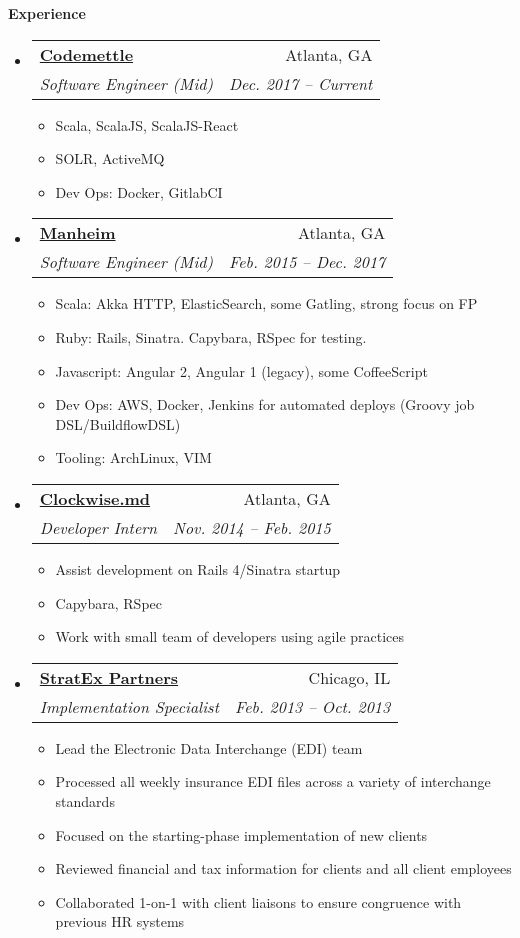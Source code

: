 \documentclass[letterpaper,11pt]{article}
\makeatletter
\newcommand{\resitem}[1]{\item #1 \vspace{-2pt}}
\newcommand{\resheading}[1]{{\large \colorbox{mygrey}{\begin{minipage}{\textwidth}{\textbf{#1 \vphantom{p\^{E}}}}\end{minipage}}}}
\newcommand{\ressubheading}[4]{
\begin{tabular*}{6.5in}{l@{\extracolsep{\fill}}r}
		\textbf{#1} & #2 \\
		\textit{#3} & \textit{#4} \\
\end{tabular*}\vspace{-6pt}}
\makeatother
\begin{document}
\resheading{Experience}
\begin{itemize}
\item
  \ressubheading{\href{http://www.codemettle.com/}{Codemettle}}{Atlanta, GA}{Software Engineer (Mid)}{Dec. 2017 -- Current}
    { \footnotesize
    \begin{itemize}
        \resitem{Scala, ScalaJS, ScalaJS-React}
        \resitem{SOLR, ActiveMQ}
        \resitem{Dev Ops: Docker, GitlabCI}
    \end{itemize}
    }
\item
  \ressubheading{\href{http://www.manheim.com/}{Manheim}}{Atlanta, GA}{Software Engineer (Mid)}{Feb. 2015 -- Dec. 2017}
    { \footnotesize
    \begin{itemize}
        \resitem{Scala: Akka HTTP, ElasticSearch, some Gatling, strong focus on FP}
        \resitem{Ruby: Rails, Sinatra. Capybara, RSpec for testing.}
        \resitem{Javascript: Angular 2, Angular 1 (legacy), some CoffeeScript}
        \resitem{Dev Ops: AWS, Docker, Jenkins for automated deploys (Groovy job DSL/BuildflowDSL)}
        \resitem{Tooling: ArchLinux, VIM}
    \end{itemize}
    }
\item
\ressubheading{\href{http://www.clockwise.md/}{Clockwise.md}}{Atlanta, GA}{Developer Intern}{Nov. 2014 -- Feb. 2015}
    { \footnotesize
    \begin{itemize}
        \resitem{Assist development on Rails 4/Sinatra startup}
        \resitem{Capybara, RSpec}
        \resitem{Work with small team of developers using agile practices}
    \end{itemize}
    }
\item
  \ressubheading{\href{http://www.stratexpartners.com/}{StratEx Partners}}{Chicago, IL}{Implementation Specialist}{Feb. 2013 -- Oct. 2013}
    { \footnotesize
    \begin{itemize}
        \resitem{Lead the Electronic Data Interchange (EDI) team}
        \resitem{Processed all weekly insurance EDI files across a variety of interchange standards}
        \resitem{Focused on the starting-phase implementation of new clients}
        \resitem{Reviewed financial and tax information for clients and all client employees}
        \resitem{Collaborated 1-on-1 with client liaisons to ensure congruence with previous HR systems}
    \end{itemize}
    }


\end{itemize}
\end{document}

